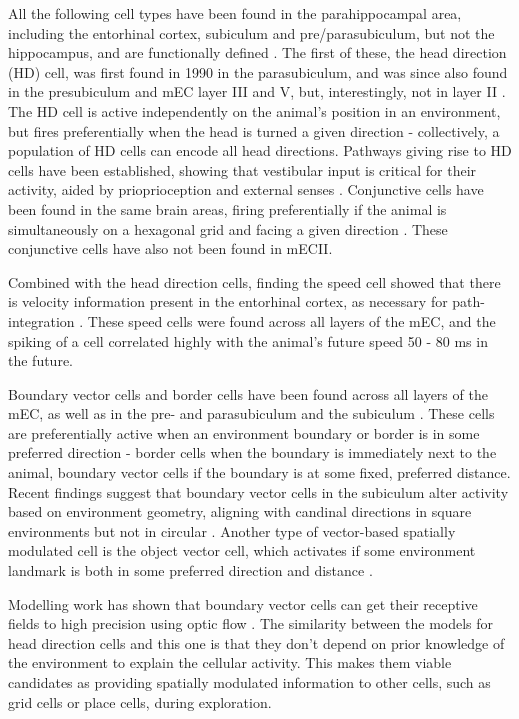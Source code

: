 \documentclass{article}
\begin{document}
    All the following cell types have been found in the parahippocampal area, including the entorhinal cortex, subiculum and pre/parasubiculum, but not the hippocampus, and are functionally defined \parencite{Brandon2014}. The first of these, the head direction (HD) cell, was first found in 1990 in the parasubiculum, and was since also found in the presubiculum and mEC layer III and V, but, interestingly, not in layer II \parencite{Taube1990}. The HD cell is active independently on the animal's position in an environment, but fires preferentially when the head is turned a given direction - collectively, a population of HD cells can encode all head directions. Pathways giving rise to HD cells have been established, showing that vestibular input is critical for their activity, aided by prioprioception and external senses \parencite{Taube2007}. Conjunctive cells have been found in the same brain areas, firing preferentially if the animal is simultaneously on a hexagonal grid and facing a given direction \parencite{Sargolini2006}. These conjunctive cells have also not been found in mECII.

    Combined with the head direction cells, finding the speed cell showed that there is velocity information present in the entorhinal cortex, as necessary for path-integration \parencite{Kropff2015}. These speed cells were found across all layers of the mEC, and the spiking of a cell correlated highly with the animal's future speed 50 - 80 ms in the future.

    Boundary vector cells and border cells have been found across all layers of the mEC, as well as in the pre- and parasubiculum and the subiculum \parencite{Solstad2008,Boccara2010, Lever2009}. These cells are preferentially active when an environment boundary or border is in some preferred direction - border cells when the boundary is immediately next to the animal, boundary vector cells if the boundary is at some fixed, preferred distance. Recent findings suggest that boundary vector cells in the subiculum alter activity based on environment geometry, aligning with candinal directions in square environments but not in circular \parencite{Muessig2024}. Another type of vector-based spatially modulated cell is the object vector cell, which activates if some environment landmark is both in some preferred direction and distance \parencite{Høydal2019}.

    Modelling work has shown that boundary vector cells can get their receptive fields to high precision using optic flow \parencite{Raudies2012}. The similarity between the models for head direction cells and this one is that they don't depend on prior knowledge of the environment to explain the cellular activity. This makes them viable candidates as providing spatially modulated information to other cells, such as grid cells or place cells, during exploration.
\end{document}
